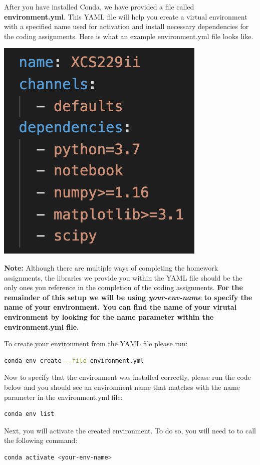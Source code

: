 \documentclass{article}
\begin{document}
After you have installed Conda, we have provided a file called \textbf{environment.yml}. This YAML file will help you create a virtual environment with a specified name used for activation and install necessary dependencies for the coding assignments. Here is what an example environment.yml file looks like.
\begin{center}
\includegraphics[scale=0.75]{conda-update.png}
\end{center}
\textbf{Note: }Although there are multiple ways of completing the homework assignments, the libraries we provide you within the YAML file should be the only ones you reference in the completion of the coding assignments. 
\textbf{For the remainder of this setup we will be using \textit{your-env-name} to specify the name of your environment. You can find the name of your virutal environment by looking for the name parameter within the environment.yml file.} 

To create your environment from the YAML file please run: 
\begin{lstlisting}[language=bash]
conda env create --file environment.yml
\end{lstlisting}
Now to specify that the environment was installed correctly, please run the code below and you should see an environment name that matches with the name parameter in the environment.yml file:
\begin{lstlisting}[language=bash]
conda env list
\end{lstlisting}

Next, you will activate the created environment. To do so, you will need to to call the following command:
\begin{lstlisting}[language=bash]
conda activate <your-env-name>
\end{lstlisting}
\end{document}
